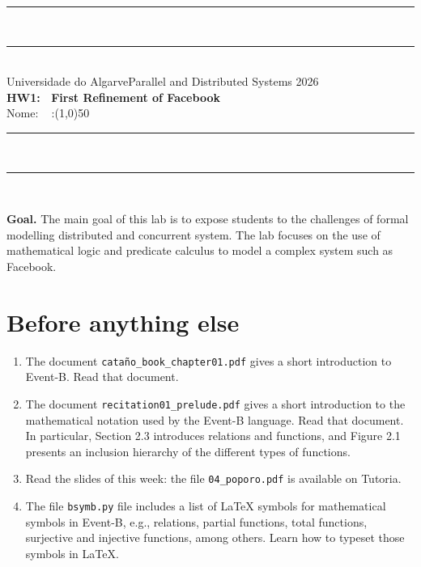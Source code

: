 \documentclass{article} %
\begin{document}
\begin{center}
\rule{\textwidth}{.0075in} \\
\rule[3mm]{\textwidth}{.0075in}\\

Universidade do Algarve\hfill Parallel and Distributed Systems \hfill 2026\\[3ex]

{\Large\bf HW1: ~First Refinement of Facebook} \\[3ex]

\vspace*{0.30cm} Nome: 
   \ %
  \textnumero:\line(1,0){50}

\rule{\textwidth}{.0075in} \\
\rule[3mm]{\textwidth}{.0075in} \\
\end{center}

\bigskip

\noindent
\textbf{Goal.} The main goal of this lab is to expose students to the challenges of formal modelling distributed and concurrent system. The lab focuses on the use of mathematical logic and predicate calculus to model a complex system such as Facebook.


\section{Before anything else}
\label{sec_before}


\begin{enumerate}[leftmargin=*, label=(\textbf{\alph*}), itemsep=-5pt]
\item The document \texttt{cataño\_\-book\_\-chapter01.\-pdf} gives a short introduction to Event-B. Read that document.
\item The document \texttt{recitation01\_\-prelude.\-pdf} gives a short introduction to the mathematical notation used by the Event-B language. Read that document. In particular, Section 2.3 introduces relations and functions, and Figure 2.1 presents an inclusion hierarchy of the different types of functions.
\item Read the slides of this week: the file \texttt{04\_\-poporo.\-pdf} is available on Tutoria.
\item The file \texttt{bsymb.py} file includes a list of LaTeX symbols for mathematical symbols in Event-B, e.g., relations, partial functions, total functions, surjective and injective functions, among others. Learn how to typeset those symbols in LaTeX.
\end{enumerate}
\end{document}
